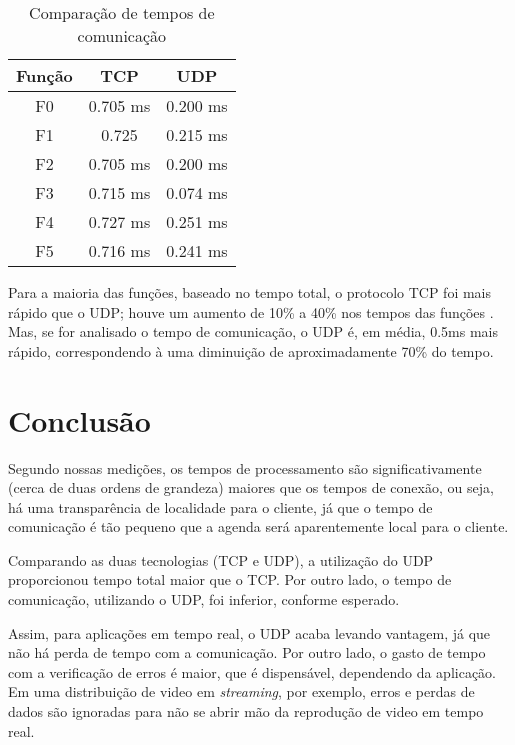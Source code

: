 \documentclass[10pt,a4paper]{article}
\begin{document}
\begin{table}[h!]
  \begin{center}
  
    \begin{tabular}{ccc}
      
      Função& TCP&  UDP \\
      \hline
      F0 & 0.705 ms & 0.200 ms\\
      F1 & 0.725 & 0.215 ms\\
      F2 & 0.705 ms & 0.200 ms\\
      F3 & 0.715 ms & 0.074 ms\\
      F4 & 0.727 ms & 0.251 ms\\
      F5 & 0.716 ms & 0.241 ms
    \end{tabular}
  \end{center}
      \vspace{-5mm}
    \caption{Comparação de tempos de comunicação} \label{compcom}
\end{table}

Para a maioria das funções, baseado no tempo total, o protocolo TCP
foi mais rápido que o UDP; houve um aumento de 10\% a 40\% nos tempos
das funções . Mas, se for analisado o tempo de
comunicação, o UDP é, em média, 0.5ms mais rápido, correspondendo à uma diminuição
de aproximadamente 70\% do tempo.


\section{Conclusão}
Segundo nossas medições, os tempos de processamento são significativamente (cerca de duas ordens de grandeza)
maiores que os tempos de conexão, ou seja, há uma transparência de localidade para o cliente, já que o tempo de comunicação é tão pequeno que a agenda será aparentemente local para o cliente.

Comparando as duas tecnologias (TCP e UDP), a utilização do UDP proporcionou  tempo total maior que o TCP. 
Por outro lado, o tempo de comunicação, utilizando o UDP, foi inferior, conforme
esperado.

Assim, para aplicações em tempo real, o UDP acaba levando vantagem, já que
não há perda de tempo com a comunicação. Por outro lado, o gasto
de tempo com a verificação de erros é maior, que é dispensável, dependendo
da aplicação. Em uma distribuição de video em \textit{streaming}, por exemplo,
 erros e perdas de dados são ignoradas para não se abrir mão da
 reprodução de video em tempo real.
\end{document}
